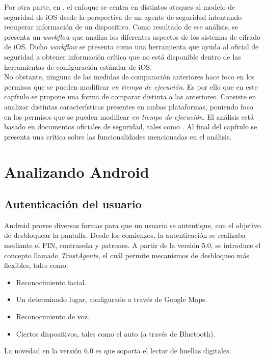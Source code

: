 Por otra parte, en \cite{TZSH13}, el enfoque se centra en distintos ataques al modelo de seguridad de iOS desde la perspectiva de un agente de seguridad intentando recuperar información de un dispositivo. Como resultado de ese análisis, se presenta un \emph{workflow} que analiza los diferentes aspectos de los sistemas de cifrado de iOS. Dicho \emph{workflow} se presenta como una herramienta que ayuda al oficial de seguridad a obtener información crítica que no está disponible dentro de las herramientas de configuración estándar de iOS.\\

No obstante, ninguna de las medidas de comparación anteriores hace foco en los permisos que se pueden modificar \emph{en tiempo de ejecución}. Es por ello que en este capítulo se propone una forma de comparar distinta a las anteriores. Consiste en analizar distintas características presentes en ambas plataformas, poniendo foco en los permisos que se pueden modificar \emph{en tiempo de ejecución}. El análisis está basado en documentos oficiales de seguridad, tales como \cite{aossec, asreview2015, asg}. Al final del capítulo se presenta una crítica sobre las funcionalidades mencionadas en el análisis.
\section{Analizando Android}
\subsection{Autenticación del usuario}
Android provee diversas formas para que un usuario se autentique, con el objetivo de desbloquear la pantalla. Desde los comienzos, la autenticación se realizaba mediante el PIN, contraseña y patrones. A partir de la versión 5.0, se introduce el concepto llamado \textit{TrustAgents}, el cuál permite mecanismos de desbloqueo más flexibles, tales como:
\begin{itemize}
	\item Reconocimiento facial.
	\item Un determinado lugar, configurado a través de Google Maps.
	\item Reconocimiento de voz.
	\item Ciertos dispositivos, tales como el auto (a través de Bluetooth).
\end{itemize}
La novedad en la versión 6.0 es que soporta el lector de huellas digitales.\\

